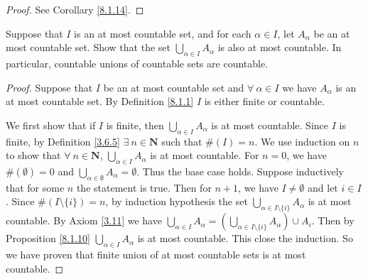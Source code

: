 \begin{proof}
    See Corollary \ref{8.1.14}.
\end{proof}

\begin{exercise}\label{ex 8.1.9}
    Suppose that \(I\) is an at most countable set, and for each \(\alpha \in I\), let \(A_{\alpha}\) be an at most countable set.
    Show that the set \(\bigcup_{\alpha \in I} A_{\alpha}\) is also at most countable.
    In particular, countable unions of countable sets are countable.
\end{exercise}

\begin{proof}
    Suppose that \(I\) be an at most countable set and \(\forall\ \alpha \in I\) we have \(A_{\alpha}\) is an at most countable set.
    By Definition \ref{8.1.1} \(I\) is either finite or countable.

    We first show that if \(I\) is finite, then \(\bigcup_{\alpha \in I} A_{\alpha}\) is at most countable.
    Since \(I\) is finite, by Definition \ref{3.6.5} \(\exists\ n \in \mathbf{N}\) such that \(\#(I) = n\).
    We use induction on \(n\) to show that \(\forall\ n \in \mathbf{N}\), \(\bigcup_{\alpha \in I} A_{\alpha}\) is at most countable.
    For \(n = 0\), we have \(\#(\emptyset) = 0\) and \(\bigcup_{\alpha \in \emptyset} A_{\alpha} = \emptyset\).
    Thus the base case holds.
    Suppose inductively that for some \(n\) the statement is true.
    Then for \(n + 1\), we have \(I \neq \emptyset\) and let \(i \in I\).
    Since \(\#(I \setminus \{i\}) = n\), by induction hypothesis the set \(\bigcup_{\alpha \in I \setminus \{i\}} A_{\alpha}\) is at most countable.
    By Axiom \ref{3.11} we have \(\bigcup_{\alpha \in I} A_{\alpha} = (\bigcup_{\alpha \in I \setminus \{i\}} A_{\alpha}) \cup A_i\).
    Then by Proposition \ref{8.1.10} \(\bigcup_{\alpha \in I} A_{\alpha}\) is at most countable.
    This close the induction.
    So we have proven that finite union of at most countable sets is at most countable.


\end{proof}
